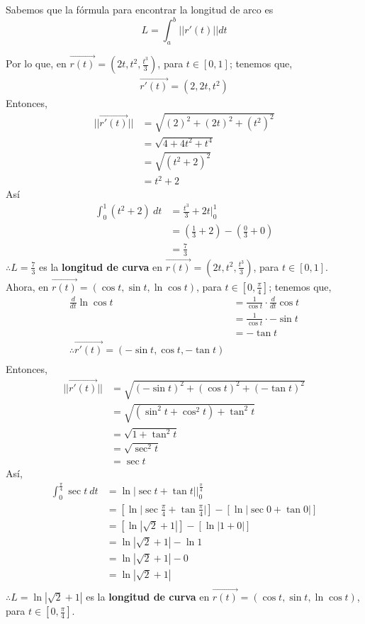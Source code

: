 \documentclass[12pt]{article}
\begin{document}
Sabemos que la fórmula para encontrar la longitud de arco es $$ L = \int_a^b ||r'(t)||dt $$

Por lo que, en $\vec{r(t)}=\left(2t,t^2,\frac{t^3}{3}\right)$, para $t \in [0,1]$; tenemos que,
\begin{align*}
  \vec{r'(t)} = \left( 2,2t,t^2 \right)
\end{align*}
Entonces,
\begin{align*}
  ||\vec{r'(t)}|| &= \sqrt{(2)^2+(2t)^2+(t^2)^2}\\
  &=  \sqrt{4+4t^2+t^4}\\
  &= \sqrt{(t^2+2)^2}\\
  &= t^2+2
\end{align*}
Así
\begin{align*}
  \int_0^1 (t^2+2)~ dt &= \frac{t^3}{3}+2t \Bigg|_0^1 \\
  &= \left(\frac{1}{3}+2 \right) - \left(\frac{0}{3}+0\right) \\
  &= \frac{7}{3}
\end{align*}
$\therefore L=\frac{7}{3}$ es la \textbf{longitud de curva} en $\vec{r(t)}=\left(2t,t^2,\frac{t^3}{3}\right)$, para $t \in [0,1]$. \\

Ahora, en $\vec{r(t)}=\left(\cos{t},\sin{t},\ln{\cos{t}}\right)$, para $t \in \left[0,\frac{\pi}{4}\right]$; tenemos que,
\begin{align*}
  \frac{d}{dt} \ln{\cos{t}} &= \frac{1}{\cos{t}} \cdot \frac{d}{dt} \cos{t}\\
  &=  \frac{1}{\cos{t}} \cdot -\sin{t}\\
  &= -\tan{t} \\
  \therefore \vec{r'(t)} = \left( -\sin{t},\cos{t}, -\tan{t}\right) \\
\end{align*}
Entonces, 
\begin{align*}
  ||\vec{r'(t)}|| &= \sqrt{(-\sin{t})^2+(\cos{t})^2+(-\tan{t})^2} \\
  &= \sqrt{(\sin^2{t}+\cos^2{t})+\tan^2{t}} \\
  &= \sqrt{1+\tan^2{t}} \\
  &= \sqrt{\sec^2{t}} \\
  &= \sec{t}
\end{align*}
Así,
\begin{align*}
  \int_0^{\frac{\pi}{4}} \sec{t}~dt &= \ln{|\sec{t}+\tan{t}|} \Bigg|_0^{\frac{\pi}{4}} \\
  &= \left[ \ln{\Bigg|\sec{\frac{\pi}{4}}+\tan{\frac{\pi}{4}}\Bigg|} \right]
  -\left[ \ln{\Bigg|\sec{0}+\tan{0}\Bigg|} \right] \\
  &= \left[ \ln{|\sqrt{2}+1|} \right]
  -\left[ \ln{|1+0|} \right] \\
  &= \ln{|\sqrt{2}+1|}
  - \ln{1} \\
  &= \ln{|\sqrt{2}+1|}
  - 0 \\
  &= \ln{|\sqrt{2}+1|}\\
\end{align*}
$\therefore L=\ln{|\sqrt{2}+1|}$ es la \textbf{longitud de curva} en  $\vec{r(t)}=\left(\cos{t},\sin{t},\ln{\cos{t}}\right)$, para $t \in \left[0,\frac{\pi}{4}\right]$.\\
\end{document}
